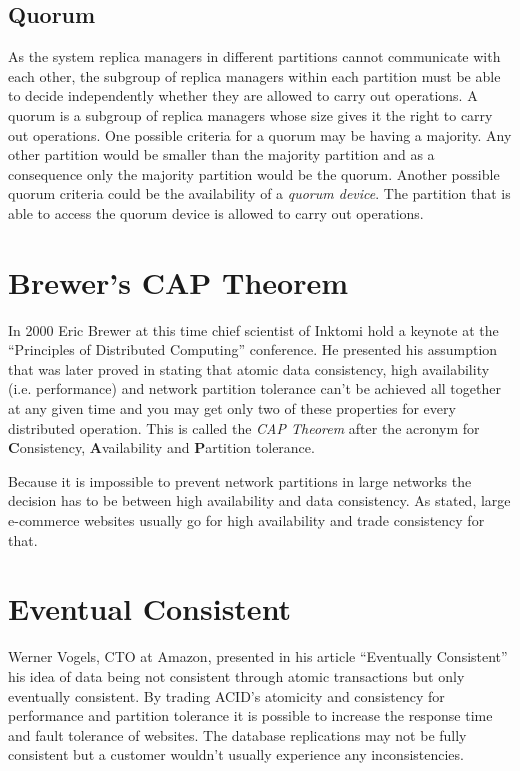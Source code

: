 \subsection{Quorum}

As the system replica managers in different partitions cannot
communicate with each other, the subgroup of replica managers
within each partition must be able to decide independently whether
they are allowed to carry out operations. A quorum is a subgroup of
replica managers whose size gives it the right to carry out
operations. \cite{Coulouris} One possible criteria for a
quorum may be having a majority. Any other partition would be
smaller than the majority partition and as a consequence only the
majority partition would be the quorum. Another possible quorum
criteria could be the availability of a \emph{quorum device}. The
partition that is able to access the quorum device is allowed to
carry out operations.

\section{Brewer's CAP Theorem}

In 2000 Eric Brewer at this time chief scientist of Inktomi hold a
keynote at the ``Principles of Distributed Computing'' conference.
He presented his assumption that was later proved in \cite{brewers-conjecture} 
stating that atomic data consistency, high availability (i.e.
performance) and network partition tolerance can't be achieved all
together at any given time and you may get only two of these
properties for every distributed operation. This is called the \emph{CAP
Theorem} after the acronym for \textbf{C}onsistency,
\textbf{A}vailability and \textbf{P}artition tolerance.

Because it is impossible to prevent network partitions in large
networks the decision has to be between high availability and data
consistency. As stated, large e-commerce websites usually go for
high availability and trade consistency for that.

\section{Eventual Consistent}

Werner Vogels, CTO at Amazon, presented in his article
``Eventually Consistent'' \cite{vogels}
his idea of data being not consistent through atomic transactions
but only eventually consistent. By trading ACID's atomicity and
consistency for performance and partition tolerance it is possible
to increase the response time and fault tolerance of websites. The
database replications may not be fully consistent but a customer
wouldn't usually experience any inconsistencies.

